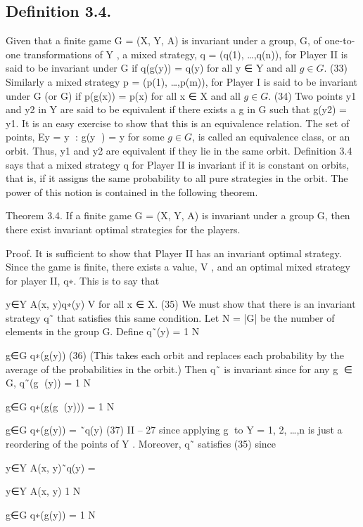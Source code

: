 \documentclass[]{report}
\begin{document}
\subsection{Definition 3.4.} Given that a finite game G = (X, Y, A) is invariant under a group, G,
of one-to-one transformations of Y , a mixed strategy, q = (q(1), \ldots,q(n)), for Player II is
said to be invariant under G if
q(g(y)) = q(y) for all y ∈ Y and all $g \in G$. (33)
Similarly a mixed strategy p = (p(1), \ldots,p(m)), for Player I is said to be invariant under
G (or G) if
p(g(x)) = p(x) for all x ∈ X and all $g \in G$. (34)
Two points y1 and y2 in Y are said to be equivalent if there exists a g in G such that
g(y2) = y1. It is an easy exercise to show that this is an equivalence relation. The set of
points, Ey = {y : g(y
) = y for some $g \in G$}, is called an equivalence class, or an orbit.
Thus, y1 and y2 are equivalent if they lie in the same orbit. Definition 3.4 says that a mixed
strategy q for Player II is invariant if it is constant on orbits, that is, if it assigns the same
probability to all pure strategies in the orbit. The power of this notion is contained in the
following theorem.
\begin{framed}
Theorem 3.4. If a finite game G = (X, Y, A) is invariant under a group G, then there
exist invariant optimal strategies for the players.
\end{framed}
Proof. It is sufficient to show that Player II has an invariant optimal strategy. Since the
game is finite, there exists a value, V , and an optimal mixed strategy for player II, q∗.
This is to say that


y∈Y
A(x, y)q∗(y) \leq V for all x ∈ X. (35)
We must show that there is an invariant strategy q˜ that satisfies this same condition. Let
N = |G| be the number of elements in the group G. Define
q˜(y) = 1
N


g∈G
q∗(g(y)) (36)
(This takes each orbit and replaces each probability by the average of the probabilities in
the orbit.) Then q˜ is invariant since for any g ∈ G,
q˜(g
(y)) = 1
N


g∈G
q∗(g(g
(y)))
= 1
N


g∈G
q∗(g(y)) = ˜q(y)
(37)
II – 27
since applying g to Y = {1, 2, \ldots,n} is just a reordering of the points of Y . Moreover, q˜
satisfies (35) since


y∈Y
A(x, y)˜q(y) = 

y∈Y
A(x, y) 1
N


g∈G
q∗(g(y))
= 1
N
\end{document}
